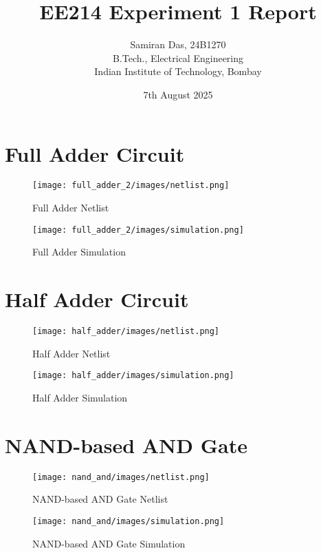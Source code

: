 \documentclass[12pt,a4paper]{article}
\title{EE214 Experiment 1 Report}
\author{Samiran Das, 24B1270 \\
B.Tech., Electrical Engineering \\
Indian Institute of Technology, Bombay}
\date{7th August 2025}
\begin{document}
\maketitle



\newpage
\section*{Full Adder Circuit}

\begin{figure}[H]
    \centering
    \texttt{[image: full\_adder\_2/images/netlist.png]}
    \caption{Full Adder Netlist}
\end{figure}

\begin{figure}[H]
    \centering
    \texttt{[image: full\_adder\_2/images/simulation.png]}
    \caption{Full Adder Simulation}
\end{figure}

\newpage
\section*{Half Adder Circuit}

\begin{figure}[H]
    \centering
    \texttt{[image: half\_adder/images/netlist.png]}
    \caption{Half Adder Netlist}
\end{figure}

\begin{figure}[H]
    \centering
    \texttt{[image: half\_adder/images/simulation.png]}
    \caption{Half Adder Simulation}
\end{figure}

\newpage
\section*{NAND-based AND Gate}

\begin{figure}[H]
    \centering
    \texttt{[image: nand\_and/images/netlist.png]}
    \caption{NAND-based AND Gate Netlist}
\end{figure}

\begin{figure}[H]
    \centering
    \texttt{[image: nand\_and/images/simulation.png]}
    \caption{NAND-based AND Gate Simulation}
\end{figure}
\end{document}
